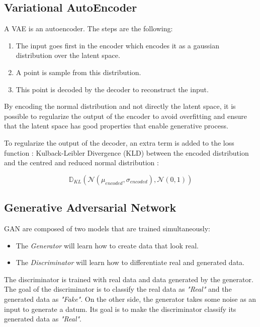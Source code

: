 \documentclass[12pt]{report}
\begin{document}
\subsection{Variational AutoEncoder}
\label{sec:back:vae}

A VAE \cite{doersch_tutorial_2016, noauthor_variational_nodate, noauthor_tutorial_nodate, akrami_robust_2019, liu_towards_2020} is an autoencoder. The steps are the following:
\begin{enumerate}
    \item The input goes first in the encoder which encodes it as a gaussian distribution over the latent space.
    \item A point is sample from this distribution.
    \item This point is decoded by the decoder to reconstruct the input.
\end{enumerate}

By encoding the normal distribution and not directly the latent space, it is possible to regularize the output of the encoder to avoid overfitting and ensure that the latent space has good properties that enable generative process.

To regularize the output of the decoder, an extra term is added to the loss function : Kulback-Leibler Divergence (KLD) between the encoded distribution and the centred and reduced normal distribution :

\begin{equation}
    \mathbb{D}_{KL} (\mathcal{N}(\mu_{encoded}, \sigma_{encoded}), \mathcal{N}(0, 1))
\end{equation}

\subsection{Generative Adversarial Network}
\label{sec:back:gan}

GAN \cite{noauthor_gan_2017, goodfellow_generative_2016, goodfellow_generative_2014} are composed of two models that are trained simultaneously:
\begin{itemize}
    \item The \textit{Generator} will learn how to create data that look real.
    \item The \textit{Discriminator} will learn how to differentiate real and generated data.
\end{itemize}

The discriminator is trained with real data and data generated by the generator.
The goal of the discriminator is to classify the real data as \textit{"Real"} and the generated data as \textit{"Fake"}.
On the other side, the generator takes some noise as an input to generate a datum.
Its goal is to make the discriminator classify its generated data as \textit{"Real"}.
\end{document}
